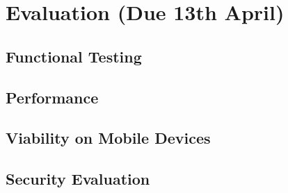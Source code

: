 \documentclass[final,dissertation.tex]{subfiles}
\begin{document}
\chapter{Evaluation (Due 13th April)}

\section{Functional Testing}

\section{Performance}

\section{Viability on Mobile Devices}

\section{Security Evaluation}
\end{document}
